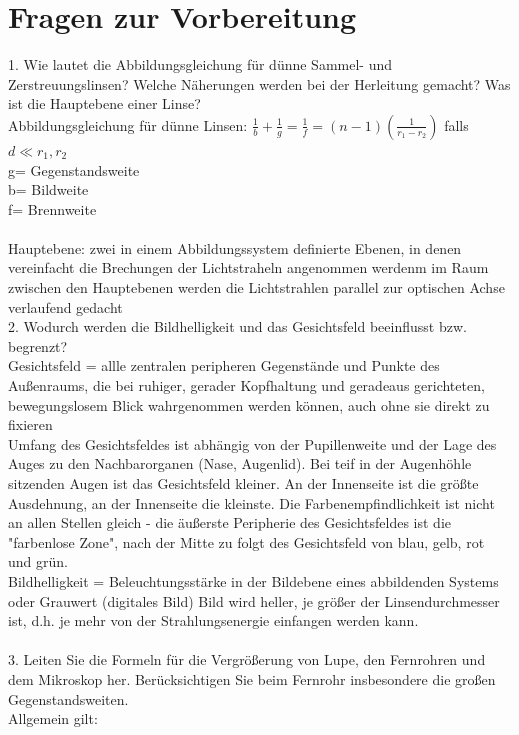 \section{Fragen zur Vorbereitung}
1. Wie lautet die Abbildungsgleichung für dünne Sammel- und Zerstreuungslinsen? Welche Näherungen werden bei der Herleitung gemacht? Was ist die Hauptebene einer Linse?\\
Abbildungsgleichung für dünne Linsen:   $\frac{1}{b}+\frac{1}{g}=\frac{1}{f}=(n-1)\left(\frac{1}{r_1-r_2}\right)$ falls $d \ll r_1, r_2$\\
g= Gegenstandsweite \\
b= Bildweite\\
f= Brennweite\\ \\
Hauptebene: zwei in einem Abbildungssystem definierte Ebenen, in denen vereinfacht die Brechungen der Lichtstraheln angenommen werdenm im Raum zwischen den Hauptebenen werden die Lichtstrahlen parallel zur optischen Achse verlaufend gedacht\\
2. Wodurch werden die Bildhelligkeit und das Gesichtsfeld beeinflusst bzw. begrenzt?\\
Gesichtsfeld = allle zentralen peripheren Gegenstände und Punkte des Außenraums, die bei ruhiger, gerader Kopfhaltung und geradeaus gerichteten, bewegungslosem Blick wahrgenommen werden können, auch ohne sie direkt zu fixieren\\
Umfang des Gesichtsfeldes ist abhängig von der Pupillenweite und der Lage des Auges zu den Nachbarorganen (Nase, Augenlid). Bei teif in der Augenhöhle sitzenden Augen ist das Gesichtsfeld kleiner. An der Innenseite ist die größte Ausdehnung, an der Innenseite die kleinste. Die Farbenempfindlichkeit ist nicht an allen Stellen gleich - die äußerste Peripherie des Gesichtsfeldes ist die "farbenlose Zone", nach der Mitte zu folgt des Gesichtsfeld von blau, gelb, rot und grün. \\
Bildhelligkeit = Beleuchtungsstärke in der Bildebene eines abbildenden Systems oder Grauwert (digitales Bild)
Bild wird heller, je größer der Linsendurchmesser ist, d.h. je mehr von der Strahlungsenergie einfangen werden kann. \\\\
3. Leiten Sie die Formeln für die Vergrößerung von Lupe, den Fernrohren und dem Mikroskop
her. Berücksichtigen Sie beim Fernrohr insbesondere die großen Gegenstandsweiten.\\
Allgemein gilt:
